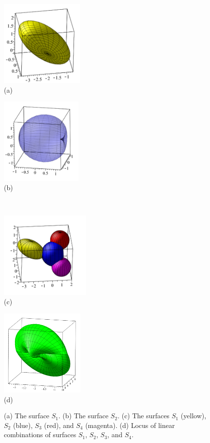\documentclass[12pt,a4paper]{article}%
\begin{document}
\begin{figure}
\begin{center}
\parbox[b]{1.6in}{\begin{center}
\includegraphics[height=1.7in]{PJH75H1E.pdf}
\\
(a)
\end{center}}
\qquad
\parbox[b]{1.6in}{\begin{center}
\includegraphics[height=1.7in]{PJH75H1F.pdf}
\\
(b)
\end{center}}
\\
\parbox[b]{1.6in}{\begin{center}
\includegraphics[height=1.7in]{PJH75H1G.pdf}
\\
(c)
\end{center}}
\qquad
\parbox[b]{1.6in}{\begin{center}
\includegraphics[height=1.7in]{PJH75H1H.pdf}
\\
(d)
\end{center}}
\end{center}
\caption{(a) The surface $S_1$.
              (b) The surface $S_2$.
              (c) The surfaces $S_1$ (yellow), $S_2$ (blue), $S_3$ (red), and $S_4$ (magenta).
              (d) Locus of linear combinations of surfaces $S_1$, $S_2$, $S_3$, and $S_4$.}
\label{fig9}
\end{figure}
\end{document}
